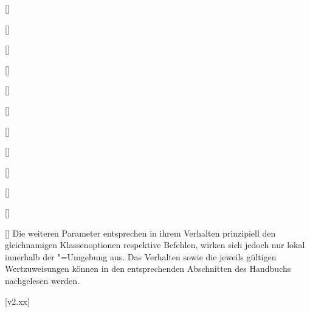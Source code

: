 \begin{Declaration}{[]}
\begin{Declaration}{[]}
\begin{Declaration}{[]}
\begin{Declaration}[v2.02]{[\PSet]}
\begin{Declaration}{[\PSet]}{%
}
\begin{Declaration}[v2.03]{[\PSet]}{%
}
\begin{Declaration}[v2.03]{[\PSet]}{%
}
\begin{Declaration}{[]}{%
}
\begin{Declaration}[v2.03]{%
  []
}{}
\begin{Declaration}[v2.02]{[\PSet]}{%
}
\begin{Declaration}[v2.02]{[\PSet]}{%
}
\begin{Declaration}[v2.02]{[\PSet]}{%
}
Die weiteren Parameter entsprechen in ihrem Verhalten prinzipiell den 
gleichnamigen Klassenoptionen respektive Befehlen, wirken sich jedoch nur lokal 
innerhalb der "=Umgebung aus. Das Verhalten sowie die 
jeweils gültigen Wertzuweisungen können in den entsprechenden Abschnitten des 
Handbuchs nachgelesen werden.
\end{Declaration}
\end{Declaration}
\end{Declaration}
\end{Declaration}
\end{Declaration}
\end{Declaration}
\end{Declaration}
\end{Declaration}
\end{Declaration}
\end{Declaration}
\end{Declaration}
\end{Declaration}

[v2.xx]


